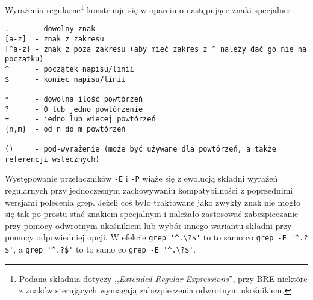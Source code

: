 \vspace{13pt}\noindent Wyrażenia regularne\footnote{
	Podana składnia dotyczy ,,\emph{Extended Regular Expressions}'', przy BRE niektóre z znaków sterujących wymagają zabezpieczenia odwrotnym ukośnikiem.
} konstruuje się w oparciu o następujące znaki specjalne:
\vspace{-6pt}\begin{Verbatim}
.      - dowolny znak
[a-z]  - znak z zakresu
[^a-z] - znak z poza zakresu (aby mieć zakres z ^ należy dać go nie na początku)
^      - początek napisu/linii
$      - koniec napisu/linii

*      - dowolna ilość powtórzeń
?      - 0 lub jedno powtórzenie
+      - jedno lub więcej powtórzeń
{n,m}  - od n do m powtórzeń

()     - pod-wyrażenie (może być używane dla powtórzeń, a także referencji wstecznych)
\end{Verbatim}

Występowanie przełączników \texttt{-E} i \texttt{-P} wiąże  się z ewolucją składni wyrażeń regularnych przy jednoczesnym zachowywaniu kompatybilności z poprzednimi wersjami polecenia grep.
Jeżeli  coś było traktowane jako zwykły znak nie mogło się tak po prostu stać znakiem specjalnym i należało zastosować zabezpieczanie przy pomocy odwrotnym ukośnikiem lub wybór innego wariantu składni przy pomocy odpowiedniej opcji.
W efekcie \Verb#grep '^.\?$'# to to samo co \Verb#grep -E '^.?$'#, a \Verb#grep '^.?$'# to to samo co \Verb#grep -E '^.\?$'#.


